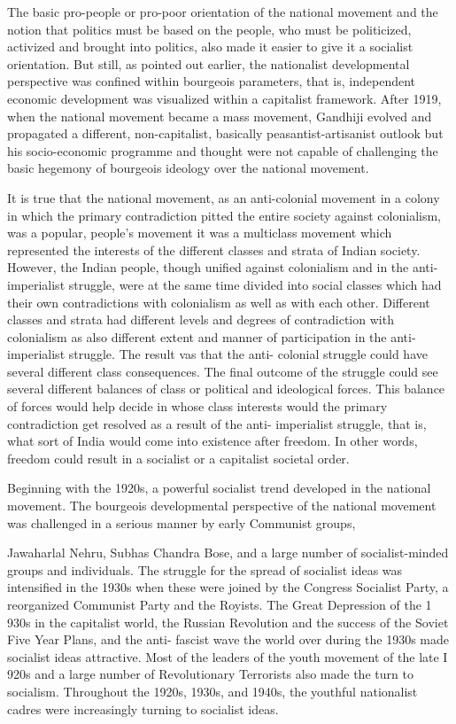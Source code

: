 \begin{multicols}{2}
The basic pro-people or pro-poor orientation of the national movement and the notion that politics must be based on the people, who must be politicized, activized and brought into politics, also made it easier to give it a socialist orientation. But still, as pointed out earlier, the nationalist developmental perspective was confined within bourgeois parameters, that is, independent economic development was visualized within a capitalist framework. After 1919, when the national movement became a mass movement, Gandhiji evolved and propagated a different, non-capitalist, basically peasantist-artisanist outlook but his socio-economic programme and thought were not capable of challenging the basic hegemony of bourgeois ideology over the national movement.

It is true that the national movement, as an anti-colonial movement in a colony in which the primary contradiction pitted the entire society against colonialism, was a popular, people's movement it was a multiclass movement which represented the interests of the different classes and strata of Indian society. However, the Indian people, though unified against colonialism and in the anti-imperialist struggle, were at the same time divided into social classes which had their own contradictions with colonialism as well as with each other. Different classes and strata had different levels and degrees of contradiction with colonialism as also different extent and manner of participation in the anti-imperialist struggle. The result vas that the anti- colonial struggle could have several different class consequences. The final outcome of the struggle could see several different balances of class or political and ideological forces. This balance of forces would help decide in whose class interests would the primary contradiction get resolved as a result of the anti- imperialist struggle, that is, what sort of India would come into existence after freedom. In other words, freedom could result in a socialist or a capitalist societal order.

Beginning with the 1920s, a powerful socialist trend developed in the national movement. The bourgeois developmental perspective of the national movement was challenged in a serious manner by early Communist groups,

Jawaharlal Nehru, Subhas Chandra Bose, and a large number of socialist-minded groups and individuals. The struggle for the spread of socialist ideas was intensified in the 1930s when these were joined by the Congress Socialist Party, a reorganized Communist Party and the Royists. The Great Depression of the 1 930s in the capitalist world, the Russian Revolution and the success of the Soviet Five Year Plans, and the anti- fascist wave the world over during the 1930s made socialist ideas attractive. Most of the leaders of the youth movement of the late I 920s and a large number of Revolutionary Terrorists also made the turn to socialism. Throughout the 1920s, 1930s, and 1940s, the youthful nationalist cadres were increasingly turning to socialist ideas.


\end{multicols}
